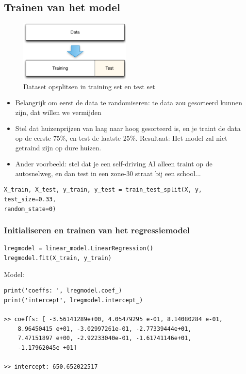 \documentclass{article}
\begin{document}
\subsection{Trainen van het model}

\begin{figure}[H]
    \centering
    \includegraphics[width=0.5\textwidth]{multiple-regression-training-testset.png}
    \caption{Dataset opsplitsen in training set en test set}
\end{figure}

\begin{itemize}
    \item Belangrijk om eerst de data te randomiseren: te data zou gesorteerd kunnen zijn, dat willen we vermijden
    \item Stel dat huizenprijzen van laag naar hoog gesorteerd is, en je traint de data op de eerste 75\%, en test de laatste 25\%.
    Resultaat: Het model zal niet getraind zijn op dure huizen.
    \item Ander voorbeeld: stel dat je een self-driving AI alleen traint op de autosnelweg, en dan test in een zone-30 straat bij een school...
\end{itemize}


\begin{verbatim}
X_train, X_test, y_train, y_test = train_test_split(X, y, test_size=0.33, 
random_state=0)
\end{verbatim}

\subsubsection{Initialiseren en trainen van het regressiemodel}

\begin{verbatim}
lregmodel = linear_model.LinearRegression()
lregmodel.fit(X_train, y_train)
\end{verbatim}

Model:

\begin{verbatim}
print('coeffs: ', lregmodel.coef_)
print('intercept', lregmodel.intercept_)

>> coeffs: [ -3.56141289e+00, 4.05479295 e-01, 8.14080284 e-01, 
    8.96450415 e+01, -3.02997261e-01, -2.77339444e+01, 
    7.47151897 e+00, -2.92233040e-01, -1.61741146e+01, 
    -1.17962045e +01]

>> intercept: 650.652022517
\end{verbatim}
\end{document}
